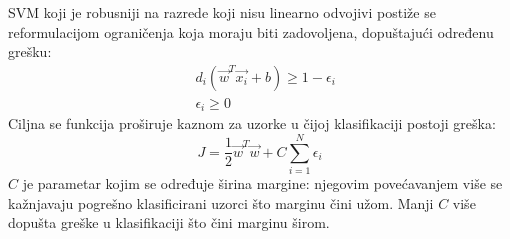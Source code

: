 \documentclass{report}
\begin{document}
SVM koji je robusniji na razrede koji nisu linearno odvojivi postiže se reformulacijom ograničenja koja moraju biti zadovoljena, dopuštajući određenu grešku:
\begin{align*}
&d_i(\vec{w}^T\vec{x_i} + b) \geq 1 - \epsilon_i\\
&\epsilon_i \geq 0
\end{align*}
Ciljna se funkcija proširuje kaznom za uzorke u čijoj klasifikaciji postoji greška:
\begin{equation*}
J = \frac{1}{2} \vec{w}^T\vec{w} + C \sum_{i=1}^N\epsilon_i
\end{equation*}
$C$ je parametar kojim se određuje širina margine: njegovim povećavanjem više se kažnjavaju pogrešno klasificirani uzorci što marginu čini užom. Manji $C$ više dopušta greške u klasifikaciji što čini marginu širom.

\nocite{phasecong_impl}
\nocite{boxcount_impl}
	
\end{document}
